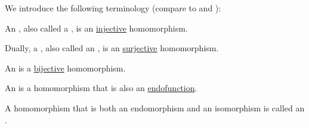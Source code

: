 \begin{definition}\label{def:first_order_homomorphism_invertibility}
  We introduce the following terminology (compare to  and ):
  \begin{thmenum}
     An , also called a , is an \hyperref[def:function_invertibility/injection]{injective} homomorphism.

     Dually, a , also called an , is an \hyperref[def:function_invertibility/surjection]{surjective} homomorphism.

     An  is a \hyperref[def:function_invertibility/bijection]{bijective} homomorphism.

     An  is a homomorphism that is also an \hyperref[def:endofunction]{endofunction}.

     A homomorphism that is both an endomorphism and an isomorphism is called an .
  \end{thmenum}
\end{definition}

